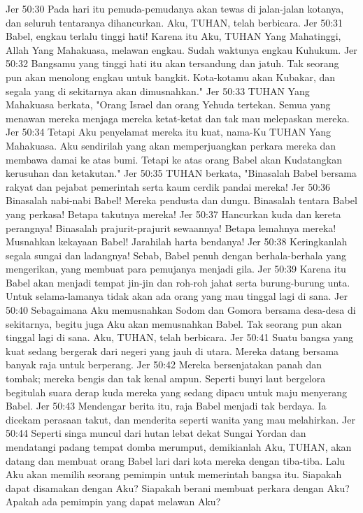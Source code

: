 Jer 50:30  Pada hari itu pemuda-pemudanya akan tewas di jalan-jalan kotanya, dan seluruh tentaranya dihancurkan. Aku, TUHAN, telah berbicara.
Jer 50:31  Babel, engkau terlalu tinggi hati! Karena itu Aku, TUHAN Yang Mahatinggi, Allah Yang Mahakuasa, melawan engkau. Sudah waktunya engkau Kuhukum.
Jer 50:32  Bangsamu yang tinggi hati itu akan tersandung dan jatuh. Tak seorang pun akan menolong engkau untuk bangkit. Kota-kotamu akan Kubakar, dan segala yang di sekitarnya akan dimusnahkan."
Jer 50:33  TUHAN Yang Mahakuasa berkata, "Orang Israel dan orang Yehuda tertekan. Semua yang menawan mereka menjaga mereka ketat-ketat dan tak mau melepaskan mereka.
Jer 50:34  Tetapi Aku penyelamat mereka itu kuat, nama-Ku TUHAN Yang Mahakuasa. Aku sendirilah yang akan memperjuangkan perkara mereka dan membawa damai ke atas bumi. Tetapi ke atas orang Babel akan Kudatangkan kerusuhan dan ketakutan."
Jer 50:35  TUHAN berkata, "Binasalah Babel bersama rakyat dan pejabat pemerintah serta kaum cerdik pandai mereka!
Jer 50:36  Binasalah nabi-nabi Babel! Mereka pendusta dan dungu. Binasalah tentara Babel yang perkasa! Betapa takutnya mereka!
Jer 50:37  Hancurkan kuda dan kereta perangnya! Binasalah prajurit-prajurit sewaannya! Betapa lemahnya mereka! Musnahkan kekayaan Babel! Jarahilah harta bendanya!
Jer 50:38  Keringkanlah segala sungai dan ladangnya! Sebab, Babel penuh dengan berhala-berhala yang mengerikan, yang membuat para pemujanya menjadi gila.
Jer 50:39  Karena itu Babel akan menjadi tempat jin-jin dan roh-roh jahat serta burung-burung unta. Untuk selama-lamanya tidak akan ada orang yang mau tinggal lagi di sana.
Jer 50:40  Sebagaimana Aku memusnahkan Sodom dan Gomora bersama desa-desa di sekitarnya, begitu juga Aku akan memusnahkan Babel. Tak seorang pun akan tinggal lagi di sana. Aku, TUHAN, telah berbicara.
Jer 50:41  Suatu bangsa yang kuat sedang bergerak dari negeri yang jauh di utara. Mereka datang bersama banyak raja untuk berperang.
Jer 50:42  Mereka bersenjatakan panah dan tombak; mereka bengis dan tak kenal ampun. Seperti bunyi laut bergelora begitulah suara derap kuda mereka yang sedang dipacu untuk maju menyerang Babel.
Jer 50:43  Mendengar berita itu, raja Babel menjadi tak berdaya. Ia dicekam perasaan takut, dan menderita seperti wanita yang mau melahirkan.
Jer 50:44  Seperti singa muncul dari hutan lebat dekat Sungai Yordan dan mendatangi padang tempat domba merumput, demikianlah Aku, TUHAN, akan datang dan membuat orang Babel lari dari kota mereka dengan tiba-tiba. Lalu Aku akan memilih seorang pemimpin untuk memerintah bangsa itu. Siapakah dapat disamakan dengan Aku? Siapakah berani membuat perkara dengan Aku? Apakah ada pemimpin yang dapat melawan Aku?
